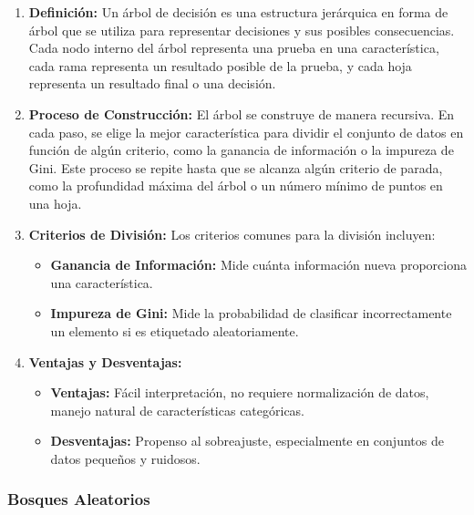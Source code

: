 \documentclass{article}
\begin{document}
\begin{enumerate}
    \item \textbf{Definición:}
        Un árbol de decisión es una estructura jerárquica en forma de árbol que se utiliza para representar decisiones y sus posibles consecuencias. Cada nodo interno del árbol representa una prueba en una característica, cada rama representa un resultado posible de la prueba, y cada hoja representa un resultado final o una decisión.

    \item \textbf{Proceso de Construcción:}
        El árbol se construye de manera recursiva. En cada paso, se elige la mejor característica para dividir el conjunto de datos en función de algún criterio, como la ganancia de información o la impureza de Gini. Este proceso se repite hasta que se alcanza algún criterio de parada, como la profundidad máxima del árbol o un número mínimo de puntos en una hoja.

    \item \textbf{Criterios de División:}
        Los criterios comunes para la división incluyen:
        \begin{itemize}
            \item \textbf{Ganancia de Información:} Mide cuánta información nueva proporciona una característica.
            \item \textbf{Impureza de Gini:} Mide la probabilidad de clasificar incorrectamente un elemento si es etiquetado aleatoriamente.
        \end{itemize}

    \item \textbf{Ventajas y Desventajas:}
        \begin{itemize}
            \item \textbf{Ventajas:} Fácil interpretación, no requiere normalización de datos, manejo natural de características categóricas.
            \item \textbf{Desventajas:} Propenso al sobreajuste, especialmente en conjuntos de datos pequeños y ruidosos.
        \end{itemize}
\end{enumerate}

\subsubsection{Bosques Aleatorios}
\end{document}
